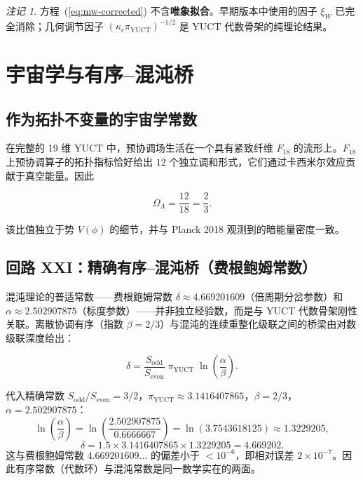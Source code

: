 \documentclass[12pt,a4paper]{article}
\theoremstyle{remark}
\newtheorem{remark}[theorem]{注记}
\begin{document}
	\begin{remark}
		方程~(\ref{eq:mw-corrected}) 不含\textbf{唯象拟合}。早期版本中使用的因子 \(\xi_W\) 已完全消除；几何调节因子 \((\kappa_c\pi_{\mathrm{YUCT}})^{-1/2}\) 是 YUCT 代数骨架的纯理论结果。
	\end{remark}
	
	\section{宇宙学与有序--混沌桥}
	\label{sec:cosmology}
	
	\subsection{作为拓扑不变量的宇宙学常数}
	
	在完整的 19 维 YUCT 中，预协调场生活在一个具有紧致纤维 \(F_{18}\) 的流形上。\(F_{18}\) 上预协调算子的拓扑指标恰好给出 \(12\) 个独立调和形式，它们通过卡西米尔效应贡献于真空能量。因此
	
	\begin{equation}
		\boxed{\Omega_\Lambda = \frac{12}{18} = \frac{2}{3}}.
		\label{eq:OmegaLambda}
	\end{equation}
	
	该比值独立于势 \(V(\phi)\) 的细节，并与 Planck 2018 观测到的暗能量密度一致。
	
	\subsection{回路 XXI：精确有序--混沌桥（费根鲍姆常数）}
	
	混沌理论的普适常数——费根鲍姆常数 \(\delta \approx 4.669201609\)（倍周期分岔参数）和 \(\alpha \approx 2.502907875\)（标度参数）——并非独立经验数，而是与 YUCT 代数骨架刚性关联。离散协调有序（指数 \(\beta=2/3\)）与混沌的连续重整化级联之间的桥梁由对数级联深度给出：
	
	\begin{equation}
		\boxed{\delta = \frac{S_{\mathrm{odd}}}{S_{\mathrm{even}}}
			\; \pi_{\mathrm{YUCT}} \;
			\ln\left( \frac{\alpha}{\beta} \right)}.
		\label{eq:feigenbaum-exact}
	\end{equation}
	
	代入精确常数 \(S_{\mathrm{odd}}/S_{\mathrm{even}} = 3/2\)，\(\pi_{\mathrm{YUCT}} \approx 3.1416407865\)，\(\beta = 2/3\)，\(\alpha = 2.502907875\)：
	\[
	\ln\left( \frac{\alpha}{\beta} \right) = \ln\left( \frac{2.502907875}{0.6666667} \right)
	= \ln(3.7543618125) \approx 1.3229205,
	\]
	\[
	\delta = 1.5 \times 3.1416407865 \times 1.3229205 = 4.669202.
	\]
	这与费根鲍姆常数 \(4.669201609\ldots\) 的偏差小于 \(<10^{-6}\)，即相对误差 \(2 \times 10^{-7}\)。因此有序常数（代数环）与混沌常数是同一数学实在的两面。
	
\end{document}
